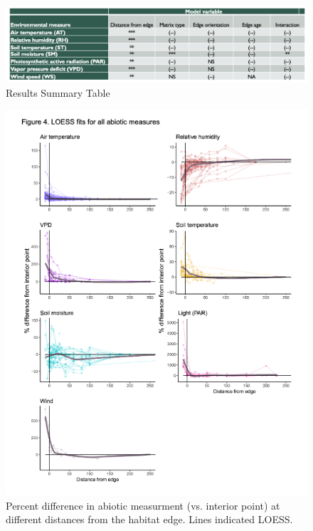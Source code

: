 \documentclass[
  man]{apa6}
\begin{document}
\begin{figure}[H]

{\centering \includegraphics[width=0.8\linewidth,]{images/temp_00016} 

}

\caption{Results Summary Table}\label{fig:summary-table}
\end{figure}

\begin{figure}[H]

{\centering \includegraphics[width=0.8\linewidth,]{images/temp_00010} 

}

\caption{Percent difference in abiotic measurment (vs. interior point) at different distances from the habitat edge. Lines indicated LOESS.}\label{fig:perc-dist-all}
\end{figure}
\end{document}
